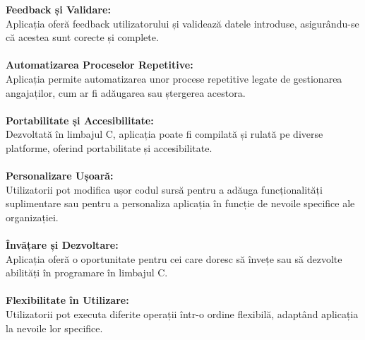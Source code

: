 \documentclass[12pt,a4paper]{article}
\begin{document}
\textbf{Feedback și Validare:\\}
Aplicația oferă feedback utilizatorului și validează datele introduse, asigurându-se că acestea sunt corecte și complete.\\\\
\textbf{Automatizarea Proceselor Repetitive:\\}
Aplicația permite automatizarea unor procese repetitive legate de gestionarea angajaților, cum ar fi adăugarea sau ștergerea acestora.\\\\
\textbf{Portabilitate și Accesibilitate:\\}
Dezvoltată în limbajul C, aplicația poate fi compilată și rulată pe diverse platforme, oferind portabilitate și accesibilitate.\\\\
\textbf{Personalizare Ușoară:\\}
Utilizatorii pot modifica ușor codul sursă pentru a adăuga funcționalități suplimentare sau pentru a personaliza aplicația în funcție de nevoile specifice ale organizației.\\\\
\textbf{Învățare și Dezvoltare:\\}
Aplicația oferă o oportunitate pentru cei care doresc să învețe sau să dezvolte abilități în programare în limbajul C.\\\\
\textbf{Flexibilitate în Utilizare:\\}
Utilizatorii pot executa diferite operații într-o ordine flexibilă, adaptând aplicația la nevoile lor specifice.\\\\

\newpage
\end{document}
